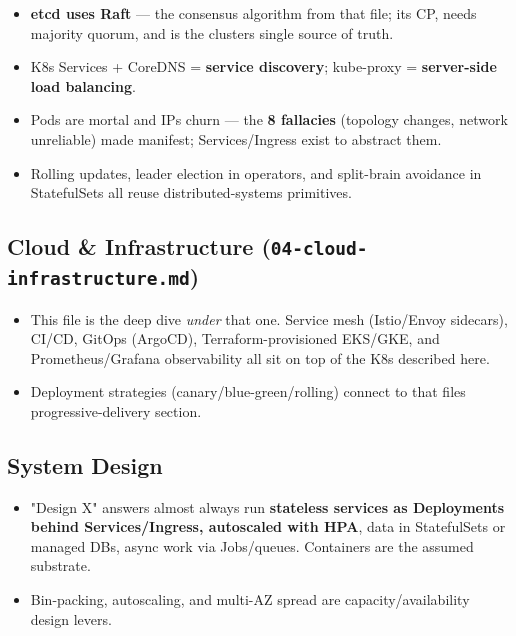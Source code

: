 \documentclass[11pt]{article}
\providecommand{\tightlist}{\setlength{\itemsep}{1pt}\setlength{\parskip}{0pt}}
\begin{document}
\begin{itemize}
\tightlist
\item
  \textbf{etcd uses Raft} --- the consensus algorithm from that file; it\textquotesingle s CP, needs majority quorum, and is the cluster\textquotesingle s single source of truth.
\item
  K8s Services + CoreDNS = \textbf{service discovery}; kube-proxy = \textbf{server-side load balancing}.
\item
  Pods are mortal and IPs churn --- the \textbf{8 fallacies} (topology changes, network unreliable) made manifest; Services/Ingress exist to abstract them.
\item
  Rolling updates, leader election in operators, and split-brain avoidance in StatefulSets all reuse distributed-systems primitives.
\end{itemize}

\subsection{\texorpdfstring{Cloud \& Infrastructure (\texttt{04-cloud-infrastructure.md})}{Cloud \& Infrastructure (04-cloud-infrastructure.md)}}\label{cloud--infrastructure-04-cloud-infrastructuremd}

\begin{itemize}
\tightlist
\item
  This file is the deep dive \emph{under} that one. Service mesh (Istio/Envoy sidecars), CI/CD, GitOps (ArgoCD), Terraform-provisioned EKS/GKE, and Prometheus/Grafana observability all sit on top of the K8s described here.
\item
  Deployment strategies (canary/blue-green/rolling) connect to that file\textquotesingle s progressive-delivery section.
\end{itemize}

\subsection{System Design}\label{system-design}

\begin{itemize}
\tightlist
\item
  "Design X" answers almost always run \textbf{stateless services as Deployments behind Services/Ingress, autoscaled with HPA}, data in StatefulSets or managed DBs, async work via Jobs/queues. Containers are the assumed substrate.
\item
  Bin-packing, autoscaling, and multi-AZ spread are capacity/availability design levers.
\end{itemize}
\end{document}
